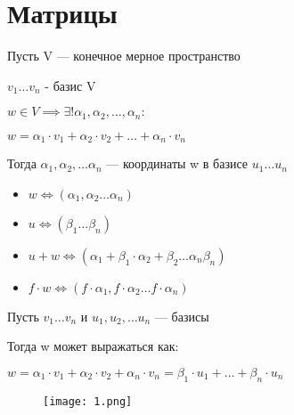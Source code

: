\section{Матрицы}

\begin{definition}
    Пусть V --- конечное мерное пространство

    $v_1 \ldots v_n$ - базис V

    $w \in V \implies \exists! \alpha_1, \alpha_2, \ldots, \alpha_n:$

    $w = \alpha_1 \cdot v_1 + \alpha_2 \cdot v_2 + \ldots + \alpha_n \cdot v_n$

    Тогда $\alpha_1, \alpha_2, \ldots \alpha_n$ --- координаты w в базисе $u_1 \ldots u_n$

    \begin{itemize}
        \item $w \Leftrightarrow (\alpha_1, \alpha_2 \ldots \alpha_n)$
        \item $u \Leftrightarrow (\beta_1 \ldots \beta_n)$
        \item $u + w \Leftrightarrow (\alpha_1 + \beta_1 \cdot \alpha_2 + \beta_2 \ldots \alpha_n \beta_n)$
        \item $f \cdot w \Leftrightarrow (f \cdot \alpha_1, f \cdot \alpha_2 \ldots f \cdot \alpha_n)$
    \end{itemize}
\end{definition}


\begin{definition}
    Пусть $v_1 \ldots v_n$ и $u_1, u_2, \ldots u_n$ --- базисы
    
    Тогда w может выражаться как:

    $w = \alpha_1 \cdot v_1 + \alpha_2 \cdot v_2 + \alpha_n \cdot v_n = \beta_1 \cdot u_1 + \ldots + \beta_n \cdot u_n$
        
\end{definition}

\begin{figure}[H]
    \centering
    \texttt{[image: 1.png]}
    
    
    \label{fig:1}
\end{figure}

